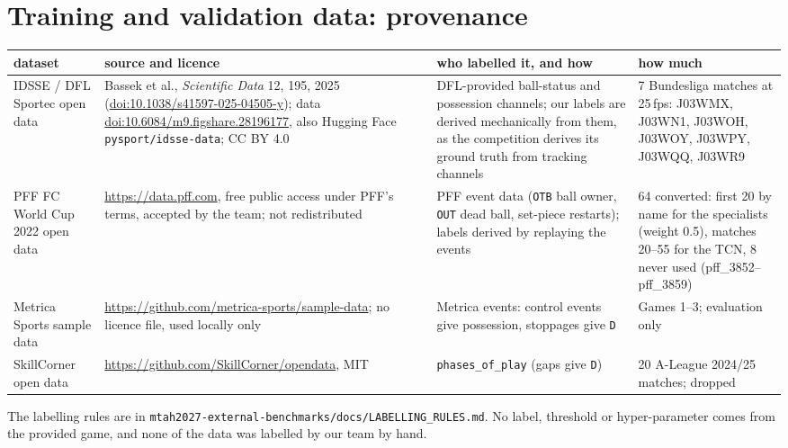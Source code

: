 \documentclass[10pt,a4paper]{article}
\newcommand{\code}[1]{\texttt{\small #1}}
\begin{document}
\section{Training and validation data: provenance}
\begin{table}[H]\centering\footnotesize
\begin{tabularx}{\linewidth}{p{2.4cm}LLp{3.6cm}}
\toprule
dataset & source and licence & who labelled it, and how & how much\\
\midrule
IDSSE / DFL Sportec open data & Bassek et al., \emph{Scientific Data} 12, 195, 2025 (\href{https://doi.org/10.1038/s41597-025-04505-y}{doi:10.1038/s41597-025-04505-y}); data \href{https://doi.org/10.6084/m9.figshare.28196177}{doi:10.6084/m9.figshare.28196177}, also Hugging Face \code{pysport/idsse-data}; CC BY 4.0 & DFL-provided ball-status and possession channels; our labels are derived mechanically from them, as the competition derives its ground truth from tracking channels & 7 Bundesliga matches at 25\,fps: J03WMX, J03WN1, J03WOH, J03WOY, J03WPY, J03WQQ, J03WR9\\
PFF FC World Cup 2022 open data & \url{https://data.pff.com}, free public access under PFF's terms, accepted by the team; not redistributed & PFF event data (\code{OTB} ball owner, \code{OUT} dead ball, set-piece restarts); labels derived by replaying the events & 64 converted: first 20 by name for the specialists (weight 0.5), matches 20--55 for the TCN, 8 never used (pff\_3852--pff\_3859)\\
Metrica Sports sample data & \url{https://github.com/metrica-sports/sample-data}; no licence file, used locally only & Metrica events: control events give possession, stoppages give \code{D} & Games 1--3; evaluation only\\
SkillCorner open data & \url{https://github.com/SkillCorner/opendata}, MIT & \code{phases\_of\_play} (gaps give \code{D}) & 20 A-League 2024/25 matches; dropped\\
\bottomrule
\end{tabularx}
\end{table}
The labelling rules are in \code{mtah2027-external-benchmarks/docs/LABELLING\_RULES.md}. No label, threshold or hyper-parameter comes from the provided game, and none of the data was labelled by our team by hand.
\end{document}
